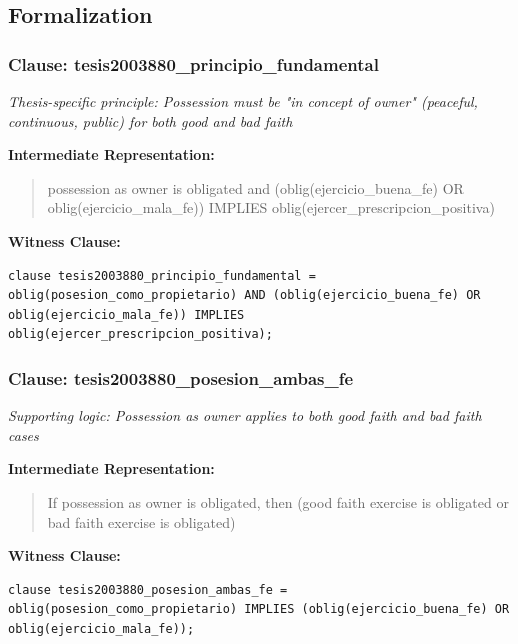\documentclass[11pt,a4paper]{article}
\begin{document}
\subsection{Formalization}

\subsubsection{Clause: tesis2003880\_principio\_fundamental}

\textit{Thesis-specific principle: Possession must be "in concept of owner" (peaceful, continuous, public) for both good and bad faith}

\textbf{Intermediate Representation:}

\begin{quote}
possession as owner is obligated and (oblig(ejercicio\_buena\_fe) OR oblig(ejercicio\_mala\_fe)) IMPLIES oblig(ejercer\_prescripcion\_positiva)
\end{quote}

\textbf{Witness Clause:}

\begin{lstlisting}[style=witnessstyle, language=Witness]
clause tesis2003880_principio_fundamental = oblig(posesion_como_propietario) AND (oblig(ejercicio_buena_fe) OR oblig(ejercicio_mala_fe)) IMPLIES oblig(ejercer_prescripcion_positiva);
\end{lstlisting}

\subsubsection{Clause: tesis2003880\_posesion\_ambas\_fe}

\textit{Supporting logic: Possession as owner applies to both good faith and bad faith cases}

\textbf{Intermediate Representation:}

\begin{quote}
If possession as owner is obligated, then (good faith exercise is obligated or bad faith exercise is obligated)
\end{quote}

\textbf{Witness Clause:}

\begin{lstlisting}[style=witnessstyle, language=Witness]
clause tesis2003880_posesion_ambas_fe = oblig(posesion_como_propietario) IMPLIES (oblig(ejercicio_buena_fe) OR oblig(ejercicio_mala_fe));
\end{lstlisting}
\end{document}
